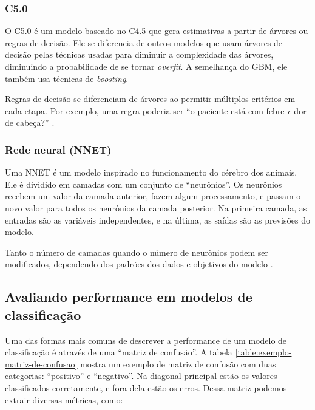 \documentclass[a4paper,titlepage]{ppgi}\usepackage[]{graphicx}\usepackage[]{color}
\begin{document}
\subsubsection{C5.0}

O C5.0 é um modelo baseado no C4.5 que gera estimativas a partir de árvores ou
regras de decisão. Ele se diferencia de outros modelos que usam árvores de
decisão pelas técnicas usadas para diminuir a complexidade das árvores,
diminuindo a probabilidade de se tornar \emph{overfit}. A semelhança do
\gls{GBM}, ele também usa técnicas de \emph{boosting}.

Regras de decisão se diferenciam de árvores ao permitir múltiplos critérios em
cada etapa. Por exemplo, uma regra poderia ser ``o paciente está com febre
\emph{e} dor de cabeça?'' \cite{Kuhn2013}.

\subsubsection{Rede neural (NNET)}

Uma \gls{NNET} é um modelo inspirado no funcionamento do cérebro dos animais.
Ele é dividido em camadas com um conjunto de ``neurônios''. Os neurônios
recebem um valor da camada anterior, fazem algum processamento, e passam o novo
valor para todos os neurônios da camada posterior. Na primeira camada, as
entradas são as variáveis independentes, e na última, as saídas são as
previsões do modelo.

Tanto o número de camadas quando o número de neurônios podem ser modificados,
dependendo dos padrões dos dados e objetivos do modelo \cite{Kuhn2013}.

\subsection{Avaliando performance em modelos de classificação}
\label{cap:fundamentacao:avaliando-modelos-de-classificacao}

\nocite{Ng2012}

Uma das formas mais comuns de descrever a performance de um modelo de
classificação é através de uma ``matriz de confusão''. A tabela
\ref{table:exemplo-matriz-de-confusao} mostra um exemplo de matriz de confusão
com duas categorias: ``positivo'' e ``negativo''. Na diagonal principal estão
os valores classificados corretamente, e fora dela estão os erros. Dessa matriz
podemos extrair diversas métricas, como:
\end{document}
